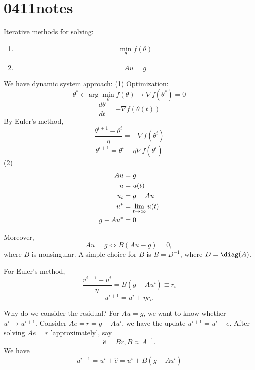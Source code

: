 \chapter{0411notes}
Iterative methods for solving:
\begin{enumerate}
\item \begin{equation}
\min_{\theta} f(\theta) 
 \end{equation}
\item \begin{equation}Au=g \end{equation}
\end{enumerate}

We have dynamic system approach:
(1) Optimization:
\begin{equation}\theta^*\in \arg\min_{\theta} f(\theta)\to \nabla f(\theta^*)=0 \end{equation}
\begin{equation}\frac{d\theta}{dt}=-\nabla f(\theta(t)) \end{equation}
By Euler's method,
\begin{equation}\frac{\theta^{i+1}-\theta^i}{\eta}=-\nabla f(\theta^i) \end{equation}
\begin{equation}\theta^{i+1}=\theta^i-\eta\nabla f(\theta^i) \end{equation}
(2) \begin{align}
Au&=g  \\\notag
u&=u(t) \\\notag
u_t&=g-Au\\\notag
u^*&=\lim_{t\to \infty}u(t)\\\notag
g-Au^*&=0
\end{align}

Moreover,
\begin{equation}Au=g \Leftrightarrow B(Au-g)=0, \end{equation} where $B$ is nonsingular. 
A simple choice for $B$ is $B=D^{-1}$, where $D=\diag(A)$.

For Euler's method,
\begin{equation}\frac{u^{i+1}-u^i}{\eta}=B(g-Au^i)\equiv r_i \end{equation}
\begin{equation} u^{i+1}=u^i+\eta r_i. \end{equation}

Why do we consider the residual?
For $Au=g$, we want to know whether $u^i \to u^{i+1}$.
Consider $Ae=r=g-Au^i$, we have the update $u^{i+1}=u^i+e$.
After solving $Ae=r$ 'approximately', say 
\begin{equation} \hat{e}=Br, B\approx A^{-1}. \end{equation} 
We have 
\begin{equation} u^{i+1}=u^i+\hat{e}=u^i+B(g-Au^i) \end{equation}

